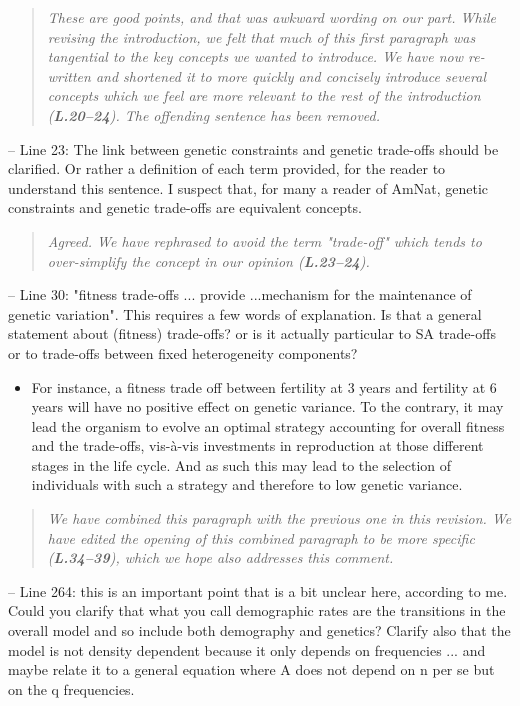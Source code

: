 \documentclass[11pt]{article}
\begin{document}
\begin{quote}
	{\itshape These are good points, and that was awkward wording on our part. While revising the introduction, we felt that much of this first paragraph was tangential to the key concepts we wanted to introduce. We have now re-written and shortened it to more quickly and concisely introduce several concepts which we feel are more relevant to the rest of the introduction ({\bf L.20--24}). The offending sentence has been removed.}
\end{quote}


\noindent -- Line 23: The link between genetic constraints and genetic trade-offs should be clarified. Or rather a definition of each term provided, for the reader to understand this sentence. I suspect that, for many a reader of AmNat, genetic constraints and genetic trade-offs are equivalent concepts.

\begin{quote}
	{\itshape Agreed. We have rephrased to avoid the term "trade-off" which tends to over-simplify the concept in our opinion ({\bf L.23--24}).}
\end{quote}

\noindent -- Line 30: "fitness trade-offs ... provide ...mechanism for the maintenance of genetic variation". This requires a few words of explanation. Is that a general statement about (fitness) trade-offs? or is it actually particular to SA trade-offs or to trade-offs between fixed heterogeneity components?
\begin{itemize}
	\item For instance, a fitness trade off between fertility at 3 years and fertility at 6 years will have no positive effect on genetic variance. To the contrary, it may lead the organism to evolve an optimal strategy accounting for overall fitness and the trade-offs, vis-à-vis investments in reproduction at those different stages in the life cycle. And as such this may lead to the selection of individuals with such a strategy and therefore to low genetic variance.
\end{itemize}

\begin{quote}
	{\itshape We have combined this paragraph with the previous one in this revision. We have edited the opening of this combined paragraph to be more specific ({\bf L.34--39}), which we hope also addresses this comment.}
\end{quote}


\noindent -- Line 264: this is an important point that is a bit unclear here, according to me. Could you clarify that what you call demographic rates are the transitions in the overall model and so include both demography and genetics? Clarify also that the model is not density dependent because it only depends on frequencies ... and maybe relate it to a general equation where A does not depend on n per se but on the q frequencies.
\end{document}
